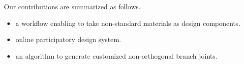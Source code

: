 

Our contributions are summarized as follows.
\begin{itemize}
 \item{a workflow enabling to take non-standard materials as design components.}
 \item{online participatory design system.} 
 \item{an algorithm to generate customized non-orthogonal branch joints.}
\end{itemize}




